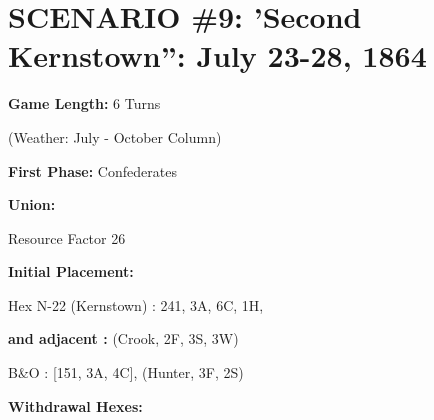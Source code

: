 \section{SCENARIO \#9: 'Second Kernstown'': July 23-28, 1864
}


\begin{scenariodata}
\textbf{Game Length:} 6 Turns\\
\end{scenariodata}

\begin{scenariodata}
(Weather: July - October Column)\\
\end{scenariodata}

\begin{scenariodata}
\textbf{First Phase:} Confederates\\
\end{scenariodata}

\begin{scenariodata}
\textbf{Union:}\\
\end{scenariodata}

\begin{scenariodata}
Resource Factor 26\\
\end{scenariodata}

\begin{scenariodata}
\textbf{Initial Placement:}\\
\end{scenariodata}

\begin{scenariodata}
Hex N-22 (Kernstown) : 241, 3A, 6C, 1H,\\
\end{scenariodata}

\begin{scenariodata}
\textbf{and adjacent :} (Crook, 2F, 3S, 3W)\\
\end{scenariodata}

\begin{scenariodata}
B\&O : [151, 3A, 4C], (Hunter, 3F, 2S)\\
\end{scenariodata}

\begin{scenariodata}
\textbf{Withdrawal Hexes:}\\
\end{scenariodata}

